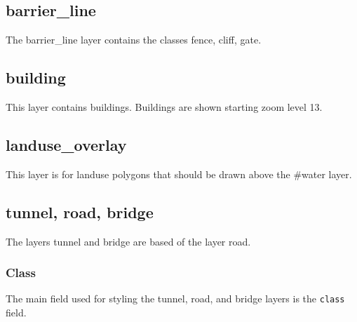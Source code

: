 \subsection*{barrier\_line}\label{barrierux5fline}

The barrier\_line layer contains the classes fence, cliff, gate.

\subsection*{building}\label{building}

This layer contains buildings. Buildings are shown starting zoom level
13.

\subsection*{landuse\_overlay}\label{landuseux5foverlay}

This layer is for landuse polygons that should be drawn above the
\#water layer.

\subsection*{tunnel, road, bridge}\label{tunnel-road-bridge}

The layers tunnel and bridge are based of the layer road.

\subsubsection*{Class}

The main field used for styling the tunnel, road, and bridge layers is the \texttt{class} field.

